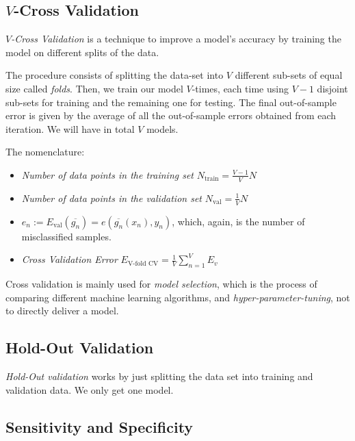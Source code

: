 \subsection{\texorpdfstring{\(V\)-Cross Validation}{V-Cross Validation}}

\emph{\(V\)-Cross Validation} is a technique to improve a model's accuracy by training the model on different splits of the data.

The procedure consists of splitting the data-set into \(V\) different sub-sets of equal size called \emph{folds}. Then, we train our model \(V\)-times, each time using \(V-1\) disjoint sub-sets for
training and the remaining one for testing. The final out-of-sample error is given by the average of all the out-of-sample errors obtained from each iteration.
We will have in total \(V\) models.

The nomenclature:

\begin{itemize}

	\item \emph{Number of data points in the training set} \(N_{\text{train}} = \frac{V - 1}{V} N\)

	\item \emph{Number of data points in the validation set} \(N_{\text{val}} = \frac{1}{V} N\)

	\item \(e_n:= E_{\text{val}} (\overline{g_n}) = e(\overline{g_n}(x_n), y_n)\), which, again, is the number of misclassified samples.

	\item \emph{Cross Validation Error} \(E_{\text{V-fold CV}} = \frac{1}{V} \sum_{n = 1}^{V} E_v\)

\end{itemize}

Cross validation is mainly used for \emph{model selection}, which is the process of comparing different machine learning algorithms, and \emph{hyper-parameter-tuning}, not to directly deliver a model. 

\subsection{Hold-Out Validation}

\emph{Hold-Out validation} works by just splitting the data set into training and validation data. We only get one model.

\subsection{Sensitivity and Specificity}

